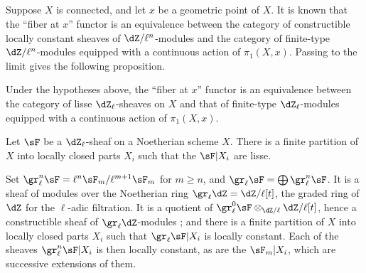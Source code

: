 \documentclass[oneside]{book}
\begin{document}
\subsection{}\label{II:2-3}

Suppose $X$ is connected, and let $x$ be a geometric point of $X$. It is
known that the ``fiber at $x$'' functor is an equivalence between the
category of constructible locally constant sheaves of
$\dZ/\ell^n$-modules and the category of finite-type
$\dZ/\ell^n$-modules equipped with a continuous action of $\pi_1(X,x)$.
Passing to the limit gives the following proposition.






\begin{proposition_}\label{II:2-4}
Under the hypotheses above, the ``fiber at $x$'' functor is an equivalence
between the category of lisse $\dZ_\ell$-sheaves on $X$ and that of
finite-type $\dZ_\ell$-modules equipped with a continuous action of
$\pi_1(X,x)$.
\end{proposition_}






\begin{proposition_}\label{II:2-5}
Let $\sF$ be a $\dZ_\ell$-sheaf on a Noetherian scheme $X$. There is a finite
partition of $X$ into locally closed parts $X_i$ such that the $\sF|X_i$ are
lisse.
\end{proposition_}

Set $\gr_\ell^n\sF=\ell^n\sF_m/\ell^{m+1}\sF_m$ for $m\geqslant n$, and
$\gr_\ell\sF=\bigoplus \gr_\ell^n\sF$. It is a sheaf of modules over the
Noetherian ring $\gr_\ell\dZ=\dZ/\ell[t]$, the graded ring of $\dZ$ for the
$\ell$-adic filtration. It is a quotient of
$\gr_\ell^0\sF \otimes_{\dZ/\ell} \dZ/\ell[t]$, hence a constructible sheaf
of $\gr_\ell\dZ$-modules \cite[IX.2]{sga4}; and there is a finite partition
of $X$ into locally closed parts $X_i$ such that
$\gr_\ell \sF|X_i$ is locally constant. Each of the sheaves
$\gr_\ell^n\sF|X_i$ is then locally constant, as are the $\sF_m|X_i$, which
are successive extensions of them.






\subsection{}\label{II:2-6}
\end{document}
